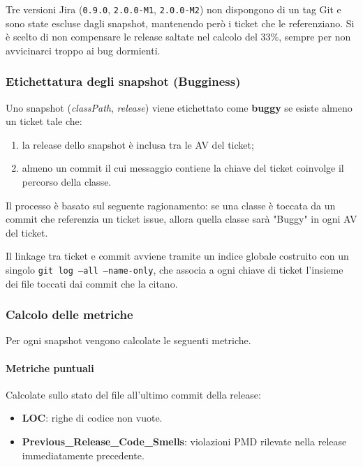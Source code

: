 Tre versioni Jira (\texttt{0.9.0}, \texttt{2.0.0-M1}, \texttt{2.0.0-M2}) non dispongono
di un tag Git e sono state escluse dagli snapshot, mantenendo però i ticket che le
referenziano. Si è scelto di non compensare le release saltate nel calcolo del 33\%, sempre per non avvicinarci troppo ai bug dormienti.

\subsubsection{Etichettatura degli snapshot (Bugginess)}

Uno snapshot (\emph{classPath}, \emph{release}) viene etichettato come \textbf{buggy} se
esiste almeno un ticket tale che:
\begin{enumerate}
    \item la release dello snapshot è inclusa tra le AV del ticket;
    \item almeno un commit il cui messaggio contiene la chiave del ticket coinvolge il
    percorso della classe.
\end{enumerate}

Il processo è basato sul seguente ragionamento: se una classe è toccata da un commit che referenzia un ticket issue, allora quella classe sarà "Buggy" in ogni AV del ticket.

Il linkage tra ticket e commit avviene tramite un indice globale costruito con un singolo
\texttt{git log --all --name-only}, che associa a ogni chiave di ticket l'insieme dei
file toccati dai commit che la citano.

\subsubsection{Calcolo delle metriche}

Per ogni snapshot vengono calcolate le seguenti metriche.

\paragraph{Metriche puntuali}
Calcolate sullo stato del file all'ultimo commit della release:
\begin{itemize}
    \item \textbf{LOC}: righe di codice non vuote.
    \item \textbf{Previous\_Release\_Code\_Smells}: violazioni PMD rilevate nella release
    immediatamente precedente.
\end{itemize}

